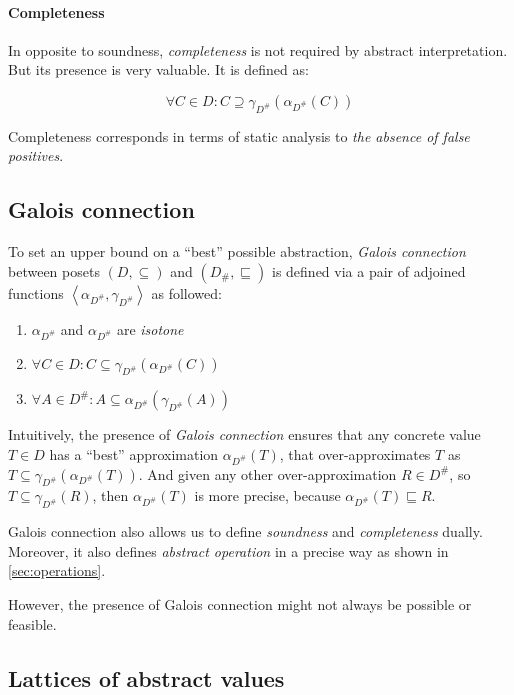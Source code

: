 \documentclass[12pt,oneside]{fithesis2}
\theoremstyle{definition}
\begin{document}
\paragraph{Completeness}
In opposite to soundness, \textit{completeness} is not required by abstract interpretation. But its presence is very valuable. It is defined as: \cite{mine-AIAA10}

\[
  \forall C \in D: C \supseteq \gamma_{D^\#}(\alpha_{D^\#}(C))
\]

Completeness corresponds in terms of static analysis to \textit{the absence of false positives}.

\subsection{Galois connection}

To set an upper bound on a ``best'' possible abstraction\cite{mine-AIAA10}, \textit{Galois connection}  between posets $(D, \subseteq)$ and $(D_\#, \sqsubseteq)$ is defined via a pair of adjoined functions $\left< \alpha_{D^\#}, \gamma_{D^\#} \right>$ as followed: \cite{CousotCousot79-1}

\begin{enumerate}
  \item $\alpha_{D^\#}$ and $\alpha_{D^\#}$ are \textit{isotone}
  \item $\forall C \in D: C \subseteq \gamma_{D^\#}(\alpha_{D^\#}(C))$
  \item $\forall A \in D^\#: A \subseteq \alpha_{D^\#}(\gamma_{D^\#}(A))$
\end{enumerate}

Intuitively, the presence of \textit{Galois connection} ensures that any concrete value $T \in D$ has a ``best'' approximation $\alpha_{D^\#}(T)$, that over-approximates $T$ as $T \subseteq \gamma_{D^\#}(\alpha_{D^\#}(T))$. And given any other over-approximation $R \in D^\#$, so $T \subseteq \gamma_{D^\#}(R)$, then $\alpha_{D^\#}(T)$ is more precise, because $\alpha_{D^\#}(T) \sqsubseteq R$.

Galois connection also allows us to define \textit{soundness} and \textit{completeness} dually. Moreover, it also defines \textit{abstract operation} in a precise way as shown in \ref{sec:operations}.

However, the presence of Galois connection might not always be possible or feasible.

\subsection{Lattices of abstract values}
\end{document}
